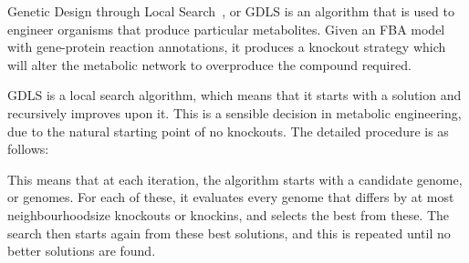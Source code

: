 Genetic Design through Local Search~\cite{Lun2009}, or GDLS is an algorithm that is used to engineer organisms that produce particular metabolites. 
Given an FBA model with gene-protein reaction annotations, it produces a knockout strategy which will alter the metabolic network to overproduce the compound required.

GDLS is a local search algorithm, which means that it starts with a solution and recursively improves upon it. 
This is a sensible decision in metabolic engineering, due to the natural starting point of no knockouts. 
The detailed procedure is as follows:


This means that at each iteration, the algorithm starts with a candidate genome, or genomes. For each of these, it evaluates every genome that differs by at most neighbourhoodsize knockouts or knockins, and selects the best from these. The search then starts again from these best solutions, and this is repeated until no better solutions are found. 